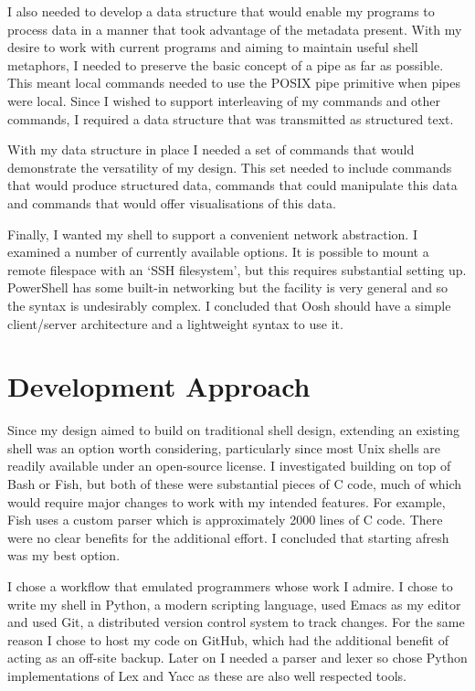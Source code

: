 \documentclass[12pt,twoside,notitlepage]{report}
\begin{document}
I also needed to develop a data structure that would enable my
programs to process data in a manner that took advantage of the
metadata present. With my desire to work with current programs and
aiming to maintain useful shell metaphors, I needed to preserve the
basic concept of a pipe as far as possible. This meant local
commands needed to use the POSIX pipe primitive when pipes were
local. Since I wished to support interleaving of my commands and other
commands, I required a data structure that was transmitted as
structured text.

With my data structure in place I needed a set of commands that would
demonstrate the versatility of my design. This set needed to include commands
that would produce structured data, commands that could manipulate this data and
commands that would offer visualisations of this data.

Finally, I wanted my shell to support a convenient network
abstraction. I examined a number of currently available options. It is
possible to mount a remote filespace with an `SSH filesystem', but
this requires substantial setting up. PowerShell has some built-in
networking but the facility is very general and so the syntax is
undesirably complex. I concluded that Oosh should have a simple client/server
architecture and a lightweight syntax to use it.

\section{Development Approach}
Since my design aimed to build on traditional shell design, extending
an existing shell was an option worth considering, particularly since
most Unix shells are readily available under an open-source license. I
investigated building on top of Bash or Fish, but both of these were
substantial pieces of C code, much of which would require major
changes to work with my intended features. For example, Fish uses a
custom parser which is approximately 2000 lines of C code. There were
no clear benefits for the additional effort. I concluded that
starting afresh was my best option.

I chose a workflow that emulated programmers whose work I admire. I
chose to write my shell in Python, a modern scripting language, used
Emacs as my editor and used Git, a distributed version control system
to track changes. For the same reason I chose to host my code on GitHub,
which had the additional benefit of acting as an off-site
backup. Later on I needed a parser and lexer so chose Python
implementations of Lex and Yacc as these are also well respected tools.
\end{document}
